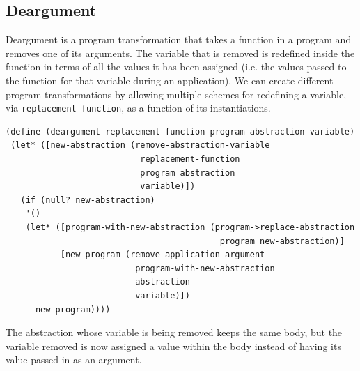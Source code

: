 \documentclass[a4paper,10pt]{article}
\begin{document}
\subsection{Deargument}
Deargument is a program transformation that takes a function in a program and removes one of its arguments.  The variable that is removed is redefined inside the function in terms of all the values it has been assigned (i.e. the values passed to the function for that variable during an application).  We can create different program transformations by allowing multiple schemes for redefining a variable, via \texttt{replacement-function},  as a function of its instantiations.  
\begin{verbatim}
(define (deargument replacement-function program abstraction variable)
 (let* ([new-abstraction (remove-abstraction-variable 
                           replacement-function 
                           program abstraction 
                           variable)])
   (if (null? new-abstraction)
    '()
    (let* ([program-with-new-abstraction (program->replace-abstraction 
                                           program new-abstraction)]
           [new-program (remove-application-argument 
                          program-with-new-abstraction 
                          abstraction 
                          variable)])
      new-program))))
\end{verbatim}
The abstraction whose variable is being removed keeps the same body, but the variable removed is now assigned a value  within the body instead of having its value passed in as an argument.
\end{document}
